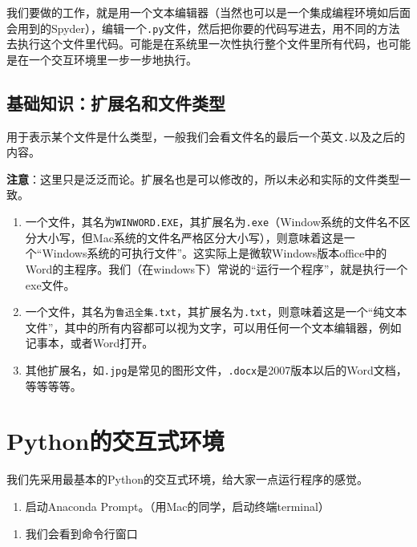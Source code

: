 \documentclass[
]{book}
\providecommand{\tightlist}{%
  \setlength{\itemsep}{0pt}\setlength{\parskip}{0pt}}
\begin{document}
我们要做的工作，就是用一个文本编辑器（当然也可以是一个集成编程环境如后面会用到的Spyder），编辑一个\texttt{.py}文件，然后把你要的代码写进去，用不同的方法去执行这个文件里代码。可能是在系统里一次性执行整个文件里所有代码，也可能是在一个交互环境里一步一步地执行。

\hypertarget{ext_name}{%
\subsection{基础知识：扩展名和文件类型}\label{ext_name}}

用于表示某个文件是什么类型，一般我们会看文件名的最后一个英文\texttt{.}以及之后的内容。

\textbf{注意}：这里只是泛泛而论。扩展名也是可以修改的，所以未必和实际的文件类型一致。

\begin{enumerate}
\def\labelenumi{\arabic{enumi}.}
\tightlist
\item
  一个文件，其名为\texttt{WINWORD.EXE}，其扩展名为\texttt{.exe}（Window系统的文件名不区分大小写，但Mac系统的文件名严格区分大小写），则意味着这是一个``Windows系统的可执行文件''。这实际上是微软Windows版本office中的Word的主程序。我们（在windows下）常说的``运行一个程序''，就是执行一个exe文件。
\item
  一个文件，其名为\texttt{鲁迅全集.txt}，其扩展名为\texttt{.txt}，则意味着这是一个``纯文本文件''，其中的所有内容都可以视为文字，可以用任何一个文本编辑器，例如记事本，或者Word打开。
\item
  其他扩展名，如\texttt{.jpg}是常见的图形文件，\texttt{.docx}是2007版本以后的Word文档，等等等等。
\end{enumerate}

\hypertarget{python_interactive}{%
\section{Python的交互式环境}\label{python_interactive}}

我们先采用最基本的Python的交互式环境，给大家一点运行程序的感觉。

\begin{enumerate}
\def\labelenumi{\arabic{enumi}.}
\tightlist
\item
  启动Anaconda Prompt。（用Mac的同学，启动终端terminal）
\end{enumerate}

\begin{enumerate}
\def\labelenumi{\arabic{enumi}.}
\setcounter{enumi}{1}
\tightlist
\item
  我们会看到命令行窗口
\end{enumerate}
\end{document}
